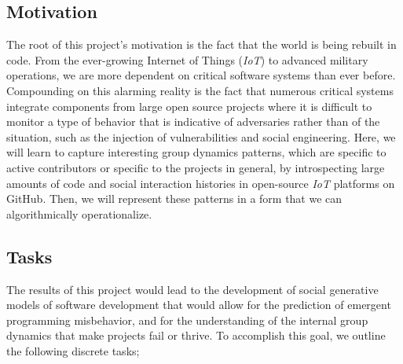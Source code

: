 \subsection{Motivation}
\label{subsec:motivation}

The root of this project's motivation is the fact that the world is being
rebuilt in code. From the ever-growing Internet of Things (\textit{IoT}) to
advanced military operations, we are more dependent on critical software systems
than ever before.  Compounding on this alarming reality is the fact that
numerous critical systems integrate components from large open source projects
where it is difficult to monitor a type of behavior that is indicative of
adversaries rather than of the situation, such as the injection of
vulnerabilities and social engineering. Here, we will learn to capture
interesting group dynamics patterns, which are specific to active contributors
or specific to the projects in general, by introspecting large amounts of code
and social interaction histories in open-source \textit{IoT} platforms on
GitHub. Then, we will represent these patterns in a form that we can
algorithmically operationalize.

\subsection{Tasks}
\label{subsec:tasks}

The results of this project would lead to the development of social generative
models of software development that would allow for the prediction of emergent
programming misbehavior, and for the understanding of the internal group
dynamics that make projects fail or thrive. To accomplish this goal, we outline
the following discrete tasks;

